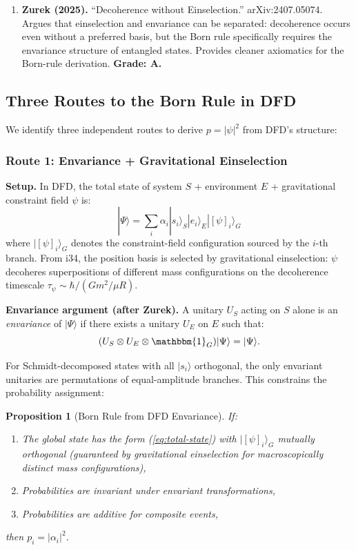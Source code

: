 \documentclass[11pt,a4paper]{article}
\newtheorem{proposition}{Proposition}
\begin{document}
\begin{enumerate}
\item \textbf{Zurek (2025).} ``Decoherence without Einselection.'' arXiv:2407.05074. Argues that einselection and envariance can be separated: decoherence occurs even without a preferred basis, but the Born rule specifically requires the envariance structure of entangled states. Provides cleaner axiomatics for the Born-rule derivation. \textbf{Grade: A.}
\end{enumerate}

\subsection{Three Routes to the Born Rule in DFD}

We identify three independent routes to derive $p = |\psi|^2$ from DFD's structure:

\subsubsection{Route 1: Envariance + Gravitational Einselection}

\textbf{Setup.} In DFD, the total state of system $S$ + environment $E$ + gravitational constraint field $\psi$ is:
\begin{equation}\label{eq:total-state}
|\Psi\rangle = \sum_i \alpha_i |s_i\rangle_S |e_i\rangle_E |[\psi]_i\rangle_G
\end{equation}
where $|[\psi]_i\rangle_G$ denotes the constraint-field configuration sourced by the $i$-th branch. From i34, the position basis is selected by gravitational einselection: $\psi$ decoheres superpositions of different mass configurations on the decoherence timescale $\tau_\psi \sim \hbar/(G m^2 / \mu R)$.

\textbf{Envariance argument (after Zurek).} A unitary $U_S$ acting on $S$ alone is an \emph{envariance} of $|\Psi\rangle$ if there exists a unitary $U_E$ on $E$ such that:
\begin{equation}
(U_S \otimes U_E \otimes \mathbbm{1}_G)|\Psi\rangle = |\Psi\rangle.
\end{equation}

For Schmidt-decomposed states with all $|s_i\rangle$ orthogonal, the only envariant unitaries are permutations of equal-amplitude branches. This constrains the probability assignment:

\begin{proposition}[Born Rule from DFD Envariance]
\label{prop:born-dfd}
If:
\begin{enumerate}
\item[(a)] The global state has the form (\ref{eq:total-state}) with $|[\psi]_i\rangle_G$ mutually orthogonal (guaranteed by gravitational einselection for macroscopically distinct mass configurations),
\item[(b)] Probabilities are invariant under envariant transformations,
\item[(c)] Probabilities are additive for composite events,
\end{enumerate}
then $p_i = |\alpha_i|^2$.
\end{proposition}
\end{document}

